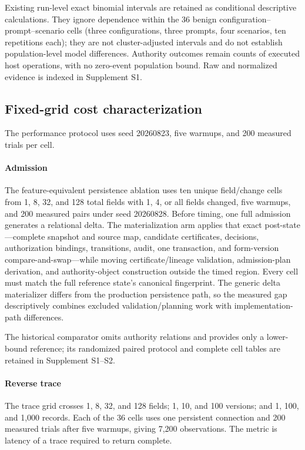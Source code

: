 Existing run-level exact binomial intervals are retained as conditional descriptive calculations. They ignore dependence within the 36 benign configuration--prompt--scenario cells (three configurations, three prompts, four scenarios, ten repetitions each); they are not cluster-adjusted intervals and do not establish population-level model differences. Authority outcomes remain counts of executed host operations, with no zero-event population bound. Raw and normalized evidence is indexed in Supplement S1.

\subsection{Fixed-grid cost characterization}

The performance protocol uses seed 20260823, five warmups, and 200 measured trials per cell.

\paragraph{Admission}
The feature-equivalent persistence ablation uses ten unique field/change cells from 1, 8, 32, and 128 total fields with 1, 4, or all fields changed, five warmups, and 200 measured pairs under seed 20260828. Before timing, one full admission generates a relational delta. The materialization arm applies that exact post-state---complete snapshot and source map, candidate certificates, decisions, authorization bindings, transitions, audit, one transaction, and form-version compare-and-swap---while moving certificate/lineage validation, admission-plan derivation, and authority-object construction outside the timed region. Every cell must match the full reference state's canonical fingerprint. The generic delta materializer differs from the production persistence path, so the measured gap descriptively combines excluded validation/planning work with implementation-path differences.

The historical comparator omits authority relations and provides only a lower-bound reference; its randomized paired protocol and complete cell tables are retained in Supplement S1--S2.

\paragraph{Reverse trace}
The trace grid crosses 1, 8, 32, and 128 fields; 1, 10, and 100 versions; and 1, 100, and 1,000 records. Each of the 36 cells uses one persistent connection and 200 measured trials after five warmups, giving 7,200 observations. The metric is latency of a trace required to return complete.

